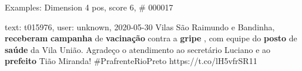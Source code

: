 \begin{frame}{Examples: Dimension 4 pos, score 6, \# 000017}
\footnotesize
\begin{exampleblock}{text: t015976, user: unknown, 2020-05-30}
Vilas São Raimundo e Bandinha, \textbf{receberam} \textbf{campanha} de 
\textbf{vacinação} contra a \textbf{gripe} , com equipe do \textbf{posto} de 
\textbf{saúde} da Vila União. Agradeço o atendimento ao secretário Luciano e ao 
\textbf{prefeito} Tião Miranda! \#PrafrenteRioPreto https://t.co/lH5vfrSR11 
\end{exampleblock}
\end{frame}
